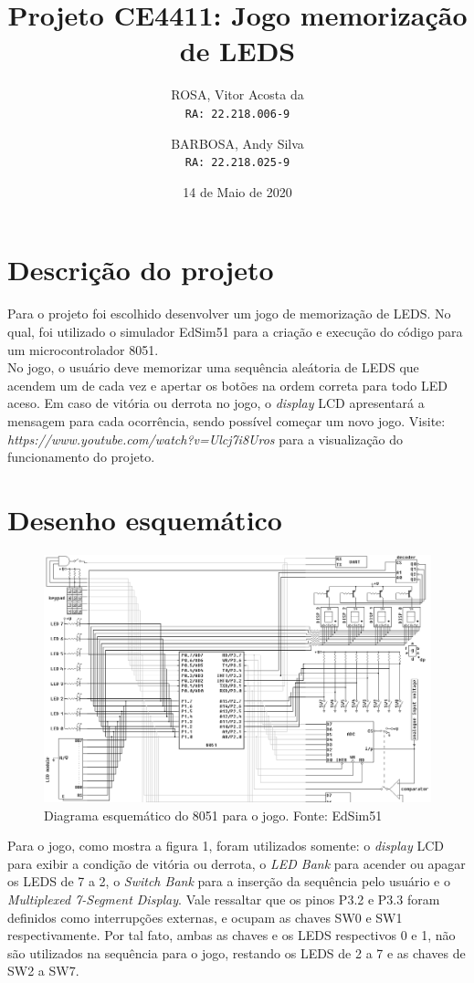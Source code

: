 \documentclass{article}
\title{\textbf{Projeto CE4411:} Jogo memorização de LEDS}
\author{
  ROSA, Vitor Acosta da\\
  \texttt{RA: 22.218.006-9}
  \and
  BARBOSA, Andy Silva\\
  \texttt{RA: 22.218.025-9}
}
\date{14 de Maio de 2020}
\begin{document}
\maketitle
\section{Descrição do projeto}
Para o projeto foi escolhido desenvolver um jogo de memorização de LEDS. No qual, foi utilizado o simulador EdSim51 para a criação e execução do código para um microcontrolador 8051.\\
No jogo, o usuário deve memorizar uma sequência aleátoria de LEDS que acendem um de cada vez e apertar os botões na ordem correta para todo LED aceso. Em caso de vitória ou derrota no jogo, o \textit{display} LCD apresentará a mensagem para cada ocorrência, sendo possível começar um novo jogo.
\newline
Visite: \textit{https://www.youtube.com/watch?v=Ulcj7i8Uros} para a visualização do funcionamento do projeto.
\section{Desenho esquemático}
\begin{figure}[H]
\hspace*{-1.5in}
\includegraphics[scale=0.5]{diagrama.png}
\caption{Diagrama esquemático do 8051 para o jogo. Fonte: EdSim51}
\end{figure}
Para o jogo, como mostra a figura 1, foram utilizados somente: o \textit{display} LCD para exibir a condição de vitória ou derrota, o \textit{LED Bank} para acender ou apagar os LEDS de 7 a 2, o \textit{Switch Bank} para a inserção da sequência pelo usuário e o \textit{Multiplexed 7-Segment Display}.\newline
Vale ressaltar que os pinos P3.2 e P3.3 foram definidos como interrupções externas, e ocupam as chaves SW0 e SW1 respectivamente. Por tal fato, ambas as chaves e os LEDS respectivos 0 e 1, não são utilizados na sequência para o jogo, restando os LEDS de 2 a 7 e as chaves de SW2 a SW7.
\newpage
\end{document}
